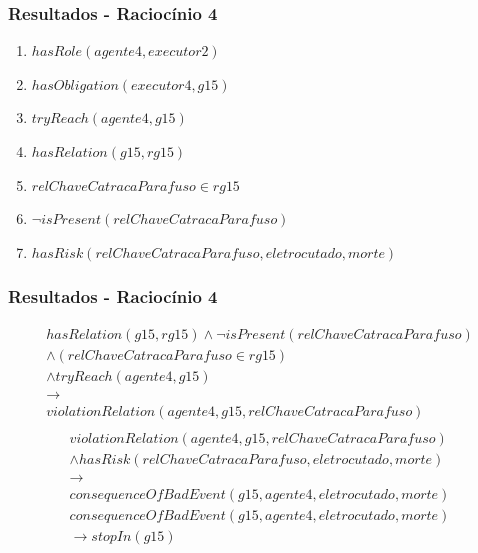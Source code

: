 \documentclass{beamer}
\begin{document}
\begin{frame}
	\frametitle{Resultados - Raciocínio 4}
	\begin{enumerate}
		\item $hasRole(agente4,executor2)$
		\item $hasObligation(executor4,g15)$	
		\item $tryReach(agente4,g15)$ 
		\item $hasRelation(g15,rg15)$
		\item $relChaveCatracaParafuso \in rg15$	
		\item $\neg isPresent(relChaveCatracaParafuso)$
		\item $hasRisk(relChaveCatracaParafuso,eletrocutado,morte)$
	\end{enumerate}
\end{frame}

\begin{frame}
	\frametitle{Resultados - Raciocínio 4}
	\begin{eqnarray}
		hasRelation(g15,rg15) \wedge \neg isPresent(relChaveCatracaParafuso)  \nonumber \\ 
		\wedge (relChaveCatracaParafuso \in rg15) \nonumber \\
		\wedge tryReach(agente4,g15) \nonumber \\ 
		\to \nonumber \\ 
		violationRelation(agente4,g15,relChaveCatracaParafuso) \nonumber \\
	\end{eqnarray}
	\begin{eqnarray}\nonumber
		violationRelation(agente4,g15,relChaveCatracaParafuso) \nonumber \\ 
		 \wedge hasRisk(relChaveCatracaParafuso,eletrocutado,morte) \nonumber \\ 
		\to \nonumber \\ 
		consequenceOfBadEvent(g15,agente4,eletrocutado,morte)
	\end{eqnarray}
	\begin{eqnarray}
		consequenceOfBadEvent(g15,agente4,eletrocutado,morte) \nonumber \\ 
		\to stopIn(g15)
	\end{eqnarray}
\end{frame}
\end{document}
